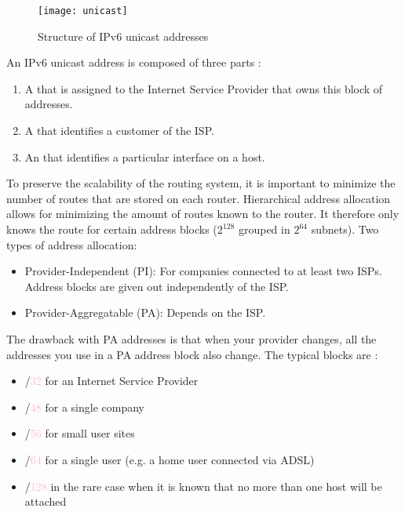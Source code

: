 \begin{minipage}{0.55\textwidth}
	\begin{figure}[H]
	    \centering
	    \texttt{[image: unicast]}
	    \caption{Structure of IPv6 unicast addresses}
	\end{figure}
\end{minipage}
\begin{minipage}{0.44\textwidth}
	An IPv6 unicast address is composed of three parts :
	\begin{enumerate}
	\item A  that is assigned to the Internet Service Provider that owns this block of addresses.
	\item A  that identifies a customer of the ISP.
	\item An  that identifies a particular interface on a host.
	\end{enumerate}
\end{minipage}

To preserve the scalability of the routing system, it is important to minimize the number of routes that are stored on each router. Hierarchical address allocation allows for minimizing the amount of routes known to the router. It therefore only knows the route for certain address blocks ($2^{128}$ grouped in $2^{64}$ subnets).
Two types of address allocation:
\begin{itemize}
\item Provider-Independent (PI): For companies connected to at least two ISPs. Address blocks are given out independently of the ISP.
\item Provider-Aggregatable (PA): Depends on the ISP.
\end{itemize}

The drawback with PA addresses is that when your provider changes, all the addresses you use in a PA address block also change. The typical  blocks are :
\begin{itemize}
\item /\textcolor{pink}{32} for an Internet Service Provider
\item /\textcolor{pink}{48} for a single company
\item /\textcolor{pink}{56} for small user sites
\item /\textcolor{pink}{64} for a single user (e.g. a home user connected via ADSL)
\item /\textcolor{pink}{128} in the rare case when it is known that no more than one host will be attached
\end{itemize}

